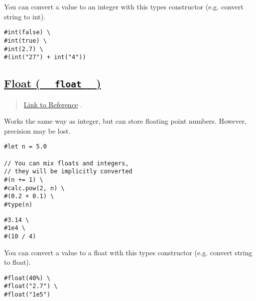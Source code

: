 You can convert a value to an integer with this type\textquotesingle s
constructor (e.g. convert string to int).

\begin{verbatim}
#int(false) \
#int(true) \
#int(2.7) \
#(int("27") + int("4"))
\end{verbatim}

\pandocbounded{}

\subsection{\texorpdfstring{\hyperref[float-float]{Float (
\texttt{\ }{\texttt{\ float\ }}\texttt{\ }
)}}{Float (   float   )}}\label{float-float}

\begin{quote}
\href{https://typst.app/docs/reference/foundations/float/}{Link to
Reference} .
\end{quote}

Works the same way as integer, but can store floating point numbers.
However, precision may be lost.

\begin{verbatim}
#let n = 5.0

// You can mix floats and integers,
// they will be implicitly converted
#(n += 1) \
#calc.pow(2, n) \
#(0.2 + 0.1) \
#type(n)
\end{verbatim}

\pandocbounded{}

\begin{verbatim}
#3.14 \
#1e4 \
#(10 / 4)
\end{verbatim}

\pandocbounded{}

You can convert a value to a float with this type\textquotesingle s
constructor (e.g. convert string to float).

\begin{verbatim}
#float(40%) \
#float("2.7") \
#float("1e5")
\end{verbatim}

\pandocbounded{}

